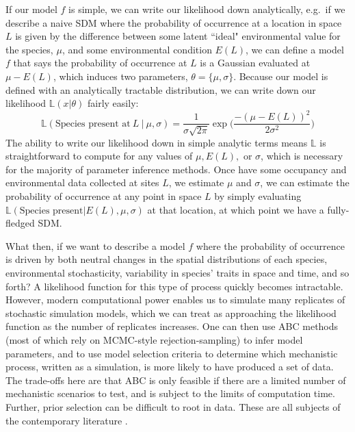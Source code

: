 \documentclass[]{article}
\begin{document}
If our model \(f\) is simple, we can write our likelihood down
analytically, e.g.~if we describe a naive SDM where the probability of
occurrence at a location in space \(L\) is given by the difference
between some latent ``ideal" environmental value for the species, \(\mu\), and some
environmental condition \(E({L})\), we can define a model \(f\) that says the
probability of occurrence at \({L}\) is a Gaussian evaluated at
\(\mu - E(L)\), which induces two parameters,
\(\theta = \{ \mu, \sigma \}\). Because our model is defined with an
analytically tractable distribution, we can write down our likelihood
\(\mathbb{L}(x | \theta)\) fairly easily:
\[\mathbb{L}(\text{Species present at} \ {L} \ |\ \mu,   \sigma) = \frac{1}{\sigma \sqrt{2\pi}} \exp \Big( \frac{-(\mu-E({L}))^2}{2\sigma^2} \Big)\]
The ability to write our likelihood down in simple analytic terms means \(\mathbb{L}\) is straightforward to compute for any
values of \(\mu, E({L}),\) or \(\sigma\), which is necessary for the
majority of parameter inference methods. Once have some occupancy and environmental data collected at sites $L$, we estimate $\mu$ and \(\sigma\), we
can estimate the probability of occurrence at any point in space \(L\)
by simply evaluating
\(\mathbb{L}(\text{Species present} | E(L) , \mu, \sigma)\) at that
location, at which point we have a fully-fledged SDM.

What then, if we want to describe a model \(f\) where the probability of
occurrence is driven by both neutral changes in the spatial
distributions of each species, environmental stochasticity, variability
in species' traits in space and time, and so forth? A likelihood
function for this type of process quickly becomes intractable. However,
modern computational power enables us to simulate many replicates of
stochastic simulation models, which we can treat as approaching the likelihood function as the
number of replicates increases. One can then use ABC methods
(most of which rely on MCMC-style rejection-sampling) to infer model
parameters, and to use model selection criteria to determine which
mechanistic process, written as a simulation, is more likely to have
produced a set of data. The trade-offs here are that ABC is only feasible if there are a limited number of mechanistic scenarios to test, and is subject to the limits of computation time. Further, prior selection can be difficult to root in data. These are all subjects of the contemporary literature  \citep{jacobs_unified_2014,beaumont_adaptive_2009,sisson_handbook_2018,beaumont_approximate_2019}.
\end{document}
